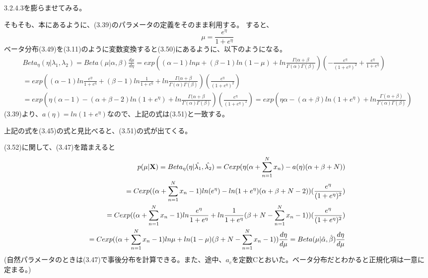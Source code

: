 \documentclass{jsarticle}
\begin{document}
3.2.4.3を膨らませてみる。

そもそも、本にあるように、(3.39)のパラメータの定義をそのまま利用する。
すると、
\begin{equation}
\mu = \frac{e^\eta}{1+e^\eta}
\end{equation}
ベータ分布(3.49)を(3.11)のように変数変換すると(3.50)にあるように、以下のようになる。
\begin{equation}
\begin{split}
Beta_\eta (\eta | \lambda_1, \lambda_2) = Beta(\mu | \alpha, \beta) \frac{d\mu}{d\eta} = exp((\alpha - 1) ln \mu + (\beta - 1) ln (1 - \mu) + ln \frac{\Gamma(\alpha + \beta}{\Gamma(\alpha)\Gamma(\beta)})(-\frac{e^\eta}{(1+e^\eta)^2} + \frac{e^\eta}{1+e^\eta})\\
= exp((\alpha - 1) ln \frac{e^\eta}{1+e^\eta} + (\beta - 1) ln \frac{1}{1+e^\eta} + ln \frac{\Gamma(\alpha + \beta}{\Gamma(\alpha)\Gamma(\beta)})(\frac{e^\eta}{(1+e^\eta)^2}) \\
= exp(\eta (\alpha - 1) - (\alpha + \beta - 2)ln (1+e^\eta) + ln \frac{\Gamma(\alpha + \beta}{\Gamma(\alpha)\Gamma(\beta)})(\frac{e^\eta}{(1+e^\eta)^2})
= exp(\eta \alpha - (\alpha + \beta)ln (1+e^\eta) + ln \frac{\Gamma(\alpha + \beta)}{\Gamma(\alpha)\Gamma(\beta)})
\end{split}
\end{equation}
(3.39)より、$a(\eta) = ln(1+e^\eta)$なので、上記の式は(3.51)と一致する。

上記の式を(3.45)の式と見比べると、(3.51)の式が出てくる。

(3.52)に関して、(3.47)を踏まえると
\begin{equation}
\begin{split}
p(\mu | {\bf X}) = Beta_\eta(\eta | \hat{\lambda_1}, \hat{\lambda_2})
= C exp(\eta (\alpha + \sum_{n = 1}^N x_n) - a(\eta)(\alpha + \beta + N))\\
= C exp((\alpha + \sum_{n = 1}^N x_n - 1)ln (e^\eta) - ln (1+e^\eta)(\alpha + \beta + N -  2))(\frac{e^\eta}{(1+e^\eta)^2})\\
= C exp((\alpha + \sum_{n = 1}^N x_n - 1)ln \frac{e^\eta}{1+e^\eta} + ln \frac{1}{1+e^\eta}(\beta + N - \sum_{n = 1}^N x_n - 1))(\frac{e^\eta}{(1+e^\eta)^2})\\
= C exp((\alpha + \sum_{n = 1}^N x_n - 1)ln \mu + ln (1 - \mu)(\beta + N - \sum_{n = 1}^N x_n - 1))\frac{d\eta}{d\mu} = Beta(\mu | \hat{\alpha}, \hat{\beta})\frac{d\eta}{d\mu}\\
\end{split}
\end{equation}
(自然パラメータのときは(3.47)で事後分布を計算できる。また、途中、$a_c$を定数Cとおいた。ベータ分布だとわかると正規化項は一意に定まる。)
\end{document}
